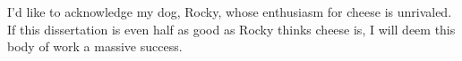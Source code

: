 I'd like to acknowledge my dog, Rocky, whose enthusiasm for cheese is unrivaled. If this dissertation is even half as good as Rocky thinks cheese is, I will deem this body of work a massive success.